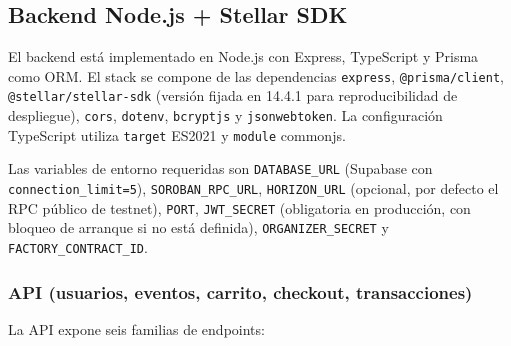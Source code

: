 \subsection{Backend Node.js + Stellar SDK}

El backend está implementado en Node.js con Express, TypeScript y Prisma como ORM. El stack se compone de las dependencias \texttt{express}, \texttt{@prisma/client}, \texttt{@stellar/stellar-sdk} (versión fijada en 14.4.1 para reproducibilidad de despliegue), \texttt{cors}, \texttt{dotenv}, \texttt{bcryptjs} y \texttt{jsonwebtoken}. La configuración TypeScript utiliza \texttt{target} ES2021 y \texttt{module} commonjs.

Las variables de entorno requeridas son \texttt{DATABASE\_URL} (Supabase con \texttt{connection\_limit=5}), \texttt{SOROBAN\_RPC\_URL}, \texttt{HORIZON\_URL} (opcional, por defecto el RPC público de testnet), \texttt{PORT}, \texttt{JWT\_SECRET} (obligatoria en producción, con bloqueo de arranque si no está definida), \texttt{ORGANIZER\_SECRET} y \texttt{FACTORY\_CONTRACT\_ID}.

\subsubsection{API (usuarios, eventos, carrito, checkout, transacciones)}

La API expone seis familias de endpoints:

